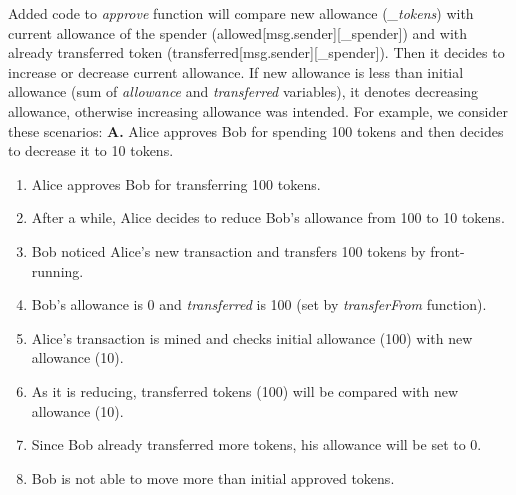 \noindent Added code to \textit{approve} function will compare new allowance (\textit{\_tokens}) with current allowance of the spender (allowed[msg.sender][\_spender]) and with already transferred token (transferred[msg.sender][\_spender]). Then it decides to increase or decrease current allowance. If new allowance is less than initial allowance (sum of \textit{allowance} and \textit{transferred} variables), it denotes decreasing allowance, otherwise increasing allowance was intended. For example, we consider these scenarios:\newline\newline
\noindent \textbf{A.} Alice approves Bob for spending 100 tokens and then decides to decrease it to 10 tokens.
\begin{enumerate}
	\item Alice approves Bob for transferring 100 tokens.
	\item After a while, Alice decides to reduce Bob’s allowance from 100 to 10 tokens.
	\item Bob noticed Alice’s new transaction and transfers 100 tokens by front-running.
	\item Bob’s allowance is 0 and \textit{transferred} is 100 (set by \textit{transferFrom} function).
	\item Alice’s transaction is mined and checks initial allowance (100) with new allowance (10).
	\item As it is reducing, transferred tokens (100) will be compared with new allowance (10).
	\item Since Bob already transferred more tokens, his allowance will be set to 0.
	\item Bob is not able to move more than initial approved tokens.\newline
\end{enumerate}

